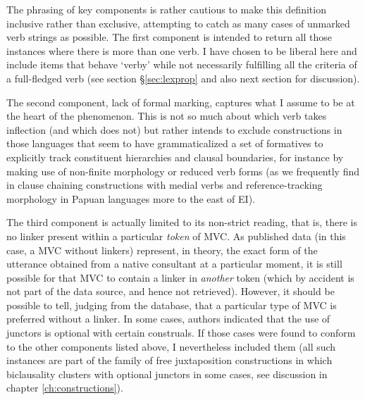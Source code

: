 The phrasing of key components is rather cautious to make this definition inclusive rather than exclusive, attempting to catch as many cases of unmarked verb strings as possible. The first component is intended to return all those instances where there is more than one verb. I have chosen to be liberal here and include items that behave `verby' while not necessarily fulfilling all the criteria of a full-fledged verb (see section §\ref{sec:lexprop} and also next section for discussion). 

The second component, lack of formal marking, captures what I assume to be at the heart of the phenomenon. This is not so much about which verb takes inflection (and which does not) but rather intends to exclude constructions in those languages that seem to have grammaticalized a set of formatives to explicitly track constituent hierarchies and clausal boundaries, for instance by making use of non-finite morphology or reduced verb forms (as we frequently find in clause chaining constructions with medial verbs and reference-tracking morphology in Papuan languages more to the east of EI). 

The third component is actually limited to its non-strict reading, that is, there is no linker present within a particular \emph{token} of MVC. As published data (in this case, a MVC without linkers) represent, in theory, the exact form of the utterance obtained from a native consultant at a particular moment, it is still possible for that MVC to contain a linker in \emph{another} token (which by accident is not part of the data source, and hence not retrieved). However, it should be possible to tell, judging from the database, that a particular type of MVC is preferred without a linker. In some cases, authors indicated that the use of junctors is optional with certain construals. If those cases were found to conform to the other components listed above, I nevertheless included them (all such instances are part of the family of free juxtaposition constructions in which biclausality clusters with optional junctors in some cases, see discussion in chapter \ref{ch:constructions}).

